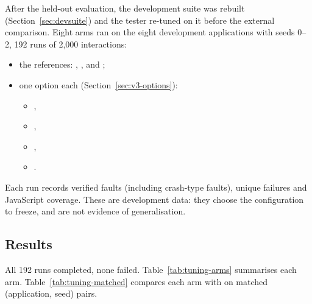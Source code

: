 After the held-out evaluation, the development suite was rebuilt (Section~\ref{sec:devsuite})
and the tester re-tuned on it before the external comparison. Eight arms ran on the eight
development applications with seeds 0--2, 192 runs of 2{,}000 interactions:

\begin{itemize}[noitemsep]
  \item the references: , ,  and
        ;
  \item one option each (Section~\ref{sec:v3-options}):
        \begin{itemize}[noitemsep]
          \item {},
          \item {},
          \item {},
          \item {}.
        \end{itemize}
\end{itemize}

Each run records verified faults (including crash-type faults), unique failures and
JavaScript coverage. These are development data: they choose the configuration to freeze,
and are not evidence of generalisation.

\subsection{Results}

All 192 runs completed, none failed. Table~\ref{tab:tuning-arms} summarises each arm.
Table~\ref{tab:tuning-matched} compares each arm with  on matched
(application, seed) pairs.

